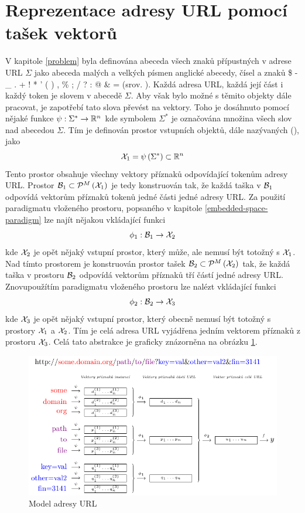 \section{Reprezentace adresy URL pomocí tašek vektorů}\label{URL_MIL_representation}
V kapitole \ref{problem} byla definována abeceda všech znaků přípustných v adrese URL \( \Sigma \) jako abeceda malých a velkých písmen anglické abecedy, čísel a znaků \$ - \_ . + ! * ' ( ) , \% ; / ? : @ \& = (srov. \cite{berners-lee_uniform_1994}). Každá adresa URL, každá její část i každý token je slovem v abecedě \( \Sigma \). Aby však bylo možné s těmito objekty dále pracovat, je zapotřebí tato slova převést na vektory. Toho je dosáhnuto pomocí nějaké funkce \( \psi : \Sigma^* \to \mathbb R^n \) kde symbolem \( \Sigma^* \) je označována množina všech slov nad abecedou \( \Sigma \). Tím je definován prostor vstupních objektů, dále nazývaných  (), jako
\[ \mathcal X_1 = \psi \left( \Sigma^* \right) \subset \mathbb R^n \]
Tento prostor obsahuje všechny vektory příznaků odpovídající tokenům adresy URL. Prostor \( \mathcal B_1 \subset \mathcal P^M \left( \mathcal X_1 \right) \) je tedy konstruován tak, že každá taška v \( \mathcal B_1 \) odpovídá vektorům příznaků tokenů jedné části jedné adresy URL. Za použití paradigmatu vloženého prostoru, popsaného v kapitole \ref{embedded-space-paradigm} lze najít nějakou vkládající funkci
\[ \phi_1 : \mathcal B_1 \to \mathcal X_2 \]
kde \( \mathcal X_2 \) je opět nějaký vstupní prostor, který může, ale nemusí být totožný s \( \mathcal X_1 \). Nad tímto prostorem je konstruován prostor tašek \( \mathcal B_2 \subset \mathcal P^M \left( \mathcal X_2 \right) \) tak, že každá taška v prostoru \( \mathcal B_2 \) odpovídá vektorům příznaků tří částí jedné adresy URL. Znovupoužítím paradigmatu vloženého prostoru lze nalézt vkládající funkci
\[ \phi_2 : \mathcal B_2 \to \mathcal X_3 \]
kde \( \mathcal X_3 \) je opět nějaký vstupní prostor, který obecně nemusí být totožný s prostory \( \mathcal X_1 \) a \( \mathcal X_2 \). Tím je celá adresa URL vyjádřena jedním vektorem příznaků z prostoru \( \mathcal X_3 \). Celá tato abstrakce je graficky znázorněna na obrázku \ref{url_model_MIL}.

\begin{figure}[h]
	\centering
	\includegraphics{images/model_MIL/model_MIL.pdf}
	\caption{Model adresy URL}\label{url_model_MIL}
\end{figure}

